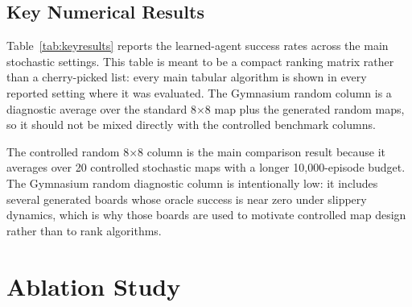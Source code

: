 \documentclass[10pt]{article}
\begin{document}
\subsection{Key Numerical Results}
Table~\ref{tab:keyresults} reports the learned-agent success rates across the main stochastic settings. This table is meant to be a compact ranking matrix rather than a cherry-picked list: every main tabular algorithm is shown in every reported setting where it was evaluated. The Gymnasium random column is a diagnostic average over the standard 8$\times$8 map plus the generated random maps, so it should not be mixed directly with the controlled benchmark columns.

\begin{table}[H]
\centering
\caption{Mean final greedy evaluation success across stochastic settings. Higher is better.}
\label{tab:keyresults}
\end{table}

The controlled random 8$\times$8 column is the main comparison result because it averages over 20 controlled stochastic maps with a longer 10,000-episode budget. The Gymnasium random diagnostic column is intentionally low: it includes several generated boards whose oracle success is near zero under slippery dynamics, which is why those boards are used to motivate controlled map design rather than to rank algorithms.

\section{Ablation Study}
\end{document}
